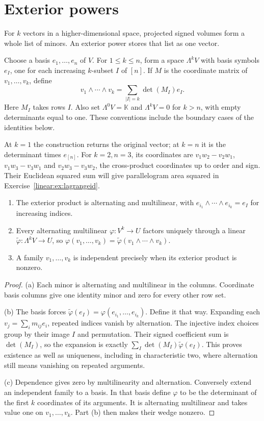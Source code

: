 \section{Exterior powers}\label{linear:sec:exterior}

For $k$ vectors in a higher-dimensional space, projected signed volumes form a whole list of minors. An exterior power stores that list as one vector.

Choose a basis $e_1,\ldots,e_n$ of $V$. For $1\le k\le n$, form a space $\Lambda^kV$ with basis symbols $e_I$, one for each increasing $k$-subset $I$ of $[n]$. If $M$ is the coordinate matrix of $v_1,\ldots,v_k$, define
\[v_1\wedge\cdots\wedge v_k=\sum_{|I|=k}\det(M_I)e_I.
\]
Here $M_I$ takes rows $I$. Also set $\Lambda^0V=\mathbb K$ and $\Lambda^kV=0$ for $k>n$, with empty determinants equal to one. These conventions include the boundary cases of the identities below.

At $k=1$ the construction returns the original vector; at $k=n$ it is the determinant times $e_{[n]}$. For $k=2,n=3$, its coordinates are $v_1w_2-v_2w_1$, $v_1w_3-v_3w_1$ and $v_2w_3-v_3w_2$, the cross-product coordinates up to order and sign. Their Euclidean squared sum will give parallelogram area squared in Exercise~\ref{linear:ex:lagrangeid}.

\begin{theorem}\label{linear:thm:exterior}
\begin{enumerate}[label=(\alph*)]
\item The exterior product is alternating and multilinear, with $e_{i_1}\wedge\cdots\wedge e_{i_k}=e_I$ for increasing indices.
\item Every alternating multilinear $\varphi:V^k\to U$ factors uniquely through a linear $\tilde\varphi:\Lambda^kV\to U$, so $\varphi(v_1,\ldots,v_k)=\tilde\varphi(v_1\wedge\cdots\wedge v_k)$.
\item A family $v_1,\ldots,v_k$ is independent precisely when its exterior product is nonzero.
\end{enumerate}
\end{theorem}
\begin{proof}
(a) Each minor is alternating and multilinear in the columns. Coordinate basis columns give one identity minor and zero for every other row set.

(b) The basis forces $\tilde\varphi(e_I)=\varphi(e_{i_1},\ldots,e_{i_k})$. Define it that way. Expanding each $v_j=\sum_im_{ij}e_i$, repeated indices vanish by alternation. The injective index choices group by their image $I$ and permutation. Their signed coefficient sum is $\det(M_I)$, so the expansion is exactly $\sum_I\det(M_I)\tilde\varphi(e_I)$. This proves existence as well as uniqueness, including in characteristic two, where alternation still means vanishing on repeated arguments.

(c) Dependence gives zero by multilinearity and alternation. Conversely extend an independent family to a basis. In that basis define $\varphi$ to be the determinant of the first $k$ coordinates of its arguments. It is alternating multilinear and takes value one on $v_1,\ldots,v_k$. Part (b) then makes their wedge nonzero.
\end{proof}

